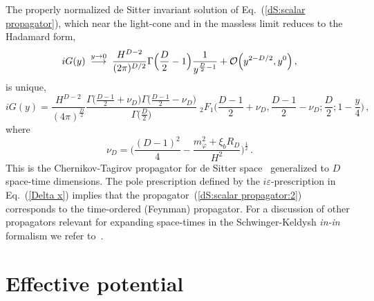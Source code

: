 The properly normalized de Sitter invariant solution of
Eq.~(\ref{dS:scalar propagator}),
which near the light-cone and in the massless limit reduces to the Hadamard
form,
\begin{equation}
  iG(y)\; \stackrel{y\rightarrow 0}{\longrightarrow}\;
 \frac{H^{D-2}}{(2\pi)^{D/2}}\Gamma\Big(\frac{D}{2}-1\Big)
               \frac{1}{y^{\frac{D}{2}-1}}
   + {\cal O}\Big(y^{2-D/2},y^0\Big)
\,,
\label{dS:Hadamard form}
\end{equation}
is unique,
\begin{equation}
    iG(y) = \frac{H^{D-2}}{(4\pi)^{\frac{D}{2}}}
           \frac{\Gamma\Big(\frac{D-1}{2}+\nu_D\Big)
                     \Gamma\Big(\frac{D-1}{2}-\nu_D\Big)}{\Gamma\Big(\frac{D}{2}\Big)}
                 \phantom{\;}_2F_1\Big(
                                   \frac{D-1}{2}+\nu_D,
                                   \frac{D-1}{2}-\nu_D;
                                   \frac{D}{2};
                                   1-\frac{y}{4}
                              \Big)
\,,
\label{dS:scalar propagator:2}
\end{equation}
where
\begin{equation}
    \nu_D = \bigg({\frac{(D-1)^2}{4}
               -  \frac{m_\varphi^2 + \xi_b R_D}{H^2}}
            \bigg)^\frac 12
\,.
\label{dS:scalar propagator:nu}
\end{equation}
This is the Chernikov-Tagirov propagator for de Sitter
space~\cite{ChernikovTagirov:1968,Tagirov:1972}
generalized to $D$ space-time dimensions.
 The pole prescription defined by the $i\varepsilon$-prescription in
Eq.~(\ref{Delta x})
implies that the propagator~(\ref{dS:scalar propagator:2})
corresponds to the time-ordered (Feynman) propagator.
For a discussion of other propagators relevant for expanding space-times
in the Schwinger-Keldysh {\it in-in} formalism we refer
to~\cite{ProkopecPuchwein:2003,Weinberg:2005}.

\bigskip

\section{Effective potential}
\label{Effective potential}

